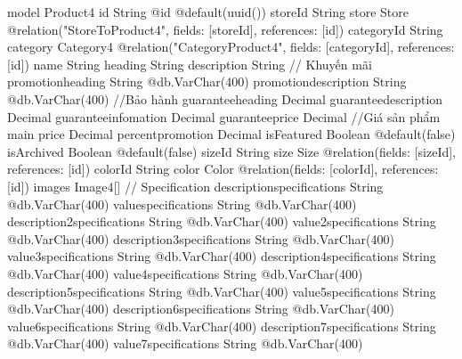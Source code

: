 model Product4 {
  id                           String                         @id @default(uuid())
  storeId                      String
  store                        Store                          @relation("StoreToProduct4", fields: [storeId], references: [id])
  categoryId                   String
  category                     Category4                      @relation("CategoryProduct4", fields: [categoryId], references: [id])
  name                         String
  heading                      String
  description                  String
  // Khuyến mãi
  promotionheading             String                         @db.VarChar(400)
  promotiondescription         String                         @db.VarChar(400)
  //Bảo hành
  guaranteeheading             Decimal
  guaranteedescription         Decimal
  guaranteeinfomation          Decimal
  guaranteeprice               Decimal
  //Giá sản phẩm main
  price                        Decimal
  percentpromotion             Decimal
  isFeatured                   Boolean                        @default(false)
  isArchived                   Boolean                        @default(false)
  sizeId                       String
  size                         Size                           @relation(fields: [sizeId], references: [id])
  colorId                      String
  color                        Color                          @relation(fields: [colorId], references: [id])
  images                       Image4[]
  // Specification
  descriptionspecifications    String                         @db.VarChar(400)
  valuespecifications          String                         @db.VarChar(400)
  description2specifications   String                         @db.VarChar(400)
  value2specifications         String                         @db.VarChar(400)
  description3specifications   String                         @db.VarChar(400)
  value3specifications         String                         @db.VarChar(400)
  description4specifications   String                         @db.VarChar(400)
  value4specifications         String                         @db.VarChar(400)
  description5specifications   String                         @db.VarChar(400)
  value5specifications         String                         @db.VarChar(400)
  description6specifications   String                         @db.VarChar(400)
  value6specifications         String                         @db.VarChar(400)
  description7specifications   String                         @db.VarChar(400)
  value7specifications         String                         @db.VarChar(400)
}
